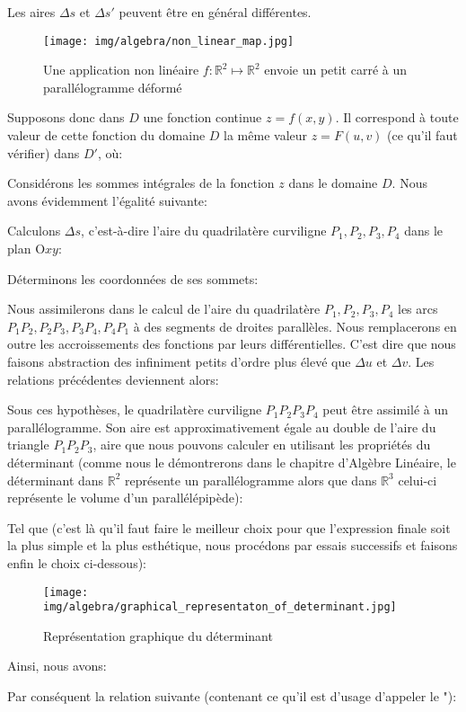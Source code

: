 	Les aires $\Delta s$ et $\Delta s'$ peuvent être en général différentes.
	 \begin{figure}[H]
		\centering
		\texttt{[image: img/algebra/non\_linear\_map.jpg]}
		\caption{Une application non linéaire $f : \mathbb{R}^2\mapsto \mathbb{R}^2$ envoie un petit carré à un parallélogramme déformé}
	\end{figure}
	Supposons donc dans $D$ une fonction continue $z=f(x,y)$. Il correspond à toute valeur de cette fonction du domaine $D$ la même valeur $z=F(u,v)$ (ce qu'il faut vérifier) dans $D'$, où:
	
	Considérons les sommes intégrales de la fonction $z$ dans le domaine $D$. Nous avons évidemment l'égalité suivante:
	
	Calculons $\Delta s$, c'est-à-dire l'aire du quadrilatère curviligne $P_1,P_2,P_3,P_4$ dans le plan $\text{O}xy$:
	
	Déterminons les coordonnées de ses sommets:
	
	Nous assimilerons dans le calcul de l'aire du quadrilatère $P_1,P_2,P_3,P_4$ les arcs $P_1P_2,P_2P_3,P_3P_4,P_4P_1$ à des segments de droites parallèles. Nous remplacerons en outre les accroissements des fonctions par leurs différentielles. C'est dire que nous faisons abstraction des infiniment petits d'ordre plus élevé que $\Delta u$ et $\Delta v$. Les relations précédentes deviennent alors:
	
	Sous ces hypothèses, le quadrilatère curviligne $P_1P_2P_3P_4$ peut être assimilé à un parallélogramme. Son aire est approximativement égale au double de l'aire du triangle  $P_1P_2P_3$, aire que nous pouvons calculer en utilisant les propriétés du déterminant (comme nous le démontrerons dans le chapitre d'Algèbre Linéaire, le déterminant dans $\mathbb{R}^2$ représente un parallélogramme alors que dans $\mathbb{R}^3$ celui-ci représente le volume d'un parallélépipède):
	
	Tel que (c'est là qu'il faut faire le meilleur choix pour que l'expression finale soit la plus simple et la plus esthétique, nous procédons par essais successifs et faisons enfin le choix ci-dessous):
	\begin{figure}[H]
		\centering
		\texttt{[image: img/algebra/graphical\_representaton\_of\_determinant.jpg]}
		\caption{Représentation graphique du déterminant}
	\end{figure}
	Ainsi, nous avons:
	
	Par conséquent la relation suivante (contenant ce qu'il est d'usage d'appeler le "):
	
